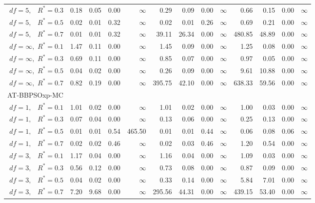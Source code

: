\documentclass[12pt]{article}
\begin{document}
\begin{table}[ht]
{\begin{tabular}{r|rrrr|rrrr|rrrr}
  $df = 5,\enspace$ $R^* =0.3$ & 0.18 & 0.05 & 0.00 & $\infty$ & 0.29 & 0.09 & 0.00 & $\infty$ & 0.66 & 0.15 & 0.00 & $\infty$ \\ 
  $df = 5,\enspace$ $R^* =0.5$ & 0.02 & 0.01 & 0.32 & $\infty$ & 0.02 & 0.01 & 0.26 & $\infty$ & 0.69 & 0.21 & 0.00 & $\infty$ \\ 
  $df = 5,\enspace$ $R^* =0.7$ & 0.01 & 0.01 & 0.32 & $\infty$ & 39.11 & 26.34 & 0.00 & $\infty$ & 480.85 & 48.89 & 0.00 & $\infty$ \\ 
  $df = \infty,$ $R^* =0.1$ & 1.47 & 0.11 & 0.00 & $\infty$ & 1.45 & 0.09 & 0.00 & $\infty$ & 1.25 & 0.08 & 0.00 & $\infty$ \\ 
  $df = \infty,$ $R^* =0.3$ & 0.69 & 0.11 & 0.00 & $\infty$ & 0.85 & 0.07 & 0.00 & $\infty$ & 0.97 & 0.05 & 0.00 & $\infty$ \\ 
  $df = \infty,$ $R^* =0.5$ & 0.04 & 0.02 & 0.00 & $\infty$ & 0.26 & 0.09 & 0.00 & $\infty$ & 9.61 & 10.88 & 0.00 & $\infty$ \\ 
  $df = \infty,$ $R^* =0.7$ & 0.82 & 0.19 & 0.00 & $\infty$ & 395.75 & 42.10 & 0.00 & $\infty$ & 638.33 & 59.56 & 0.00 & $\infty$ \\ 
\hline
\multicolumn{1}{l|}{AT-BBPSOxp-MC} &&&&&&&&&&&&\\
  $df = 1,\enspace$ $R^* =0.1$ & 1.01 & 0.02 & 0.00 & $\infty$ & 1.01 & 0.02 & 0.00 & $\infty$ & 1.00 & 0.03 & 0.00 & $\infty$ \\ 
  $df = 1,\enspace$ $R^* =0.3$ & 0.07 & 0.04 & 0.00 & $\infty$ & 0.13 & 0.06 & 0.00 & $\infty$ & 0.25 & 0.13 & 0.00 & $\infty$ \\ 
  $df = 1,\enspace$ $R^* =0.5$ & 0.01 & 0.01 & 0.54 & 465.50 & 0.01 & 0.01 & 0.44 & $\infty$ & 0.06 & 0.08 & 0.06 & $\infty$ \\ 
  $df = 1,\enspace$ $R^* =0.7$ & 0.02 & 0.02 & 0.46 & $\infty$ & 0.02 & 0.03 & 0.46 & $\infty$ & 1.20 & 0.54 & 0.00 & $\infty$ \\ 
  $df = 3,\enspace$ $R^* =0.1$ & 1.17 & 0.04 & 0.00 & $\infty$ & 1.16 & 0.04 & 0.00 & $\infty$ & 1.09 & 0.03 & 0.00 & $\infty$ \\ 
  $df = 3,\enspace$ $R^* =0.3$ & 0.56 & 0.12 & 0.00 & $\infty$ & 0.73 & 0.08 & 0.00 & $\infty$ & 0.87 & 0.09 & 0.00 & $\infty$ \\ 
  $df = 3,\enspace$ $R^* =0.5$ & 0.04 & 0.02 & 0.00 & $\infty$ & 0.33 & 0.14 & 0.00 & $\infty$ & 5.84 & 7.01 & 0.00 & $\infty$ \\ 
  $df = 3,\enspace$ $R^* =0.7$ & 7.20 & 9.68 & 0.00 & $\infty$ & 295.56 & 44.31 & 0.00 & $\infty$ & 439.15 & 53.40 & 0.00 & $\infty$ \\ 

\end{tabular}}
\end{table}
\end{document}
